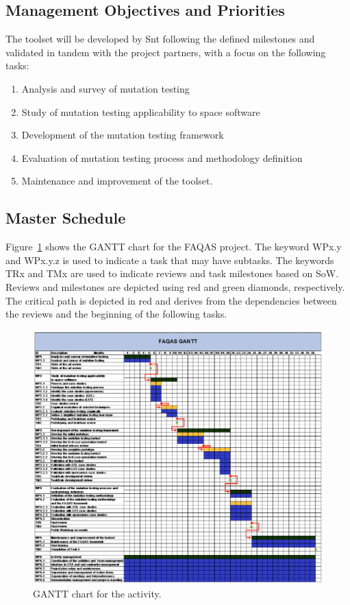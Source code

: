 \subsection{Management Objectives and Priorities}

The toolset will be developed by Snt following the defined milestones and validated in tandem with the project partners, with a focus on the following tasks:
\begin{enumerate}
  \item Analysis and survey of mutation testing
  \item Study of mutation testing applicability to space software
  \item Development of the mutation testing framework
  \item Evaluation of mutation testing process and methodology
definition
  \item Maintenance and improvement of the toolset.
\end{enumerate}

\subsection{Master Schedule}

Figure~\ref{fig:GANTT} shows the GANTT chart for the FAQAS project.
The keyword WPx.y and WPx.y.z is used to indicate a task that may have subtasks. The keywords TRx and TMx are used to indicate reviews and task milestones based on SoW. Reviews and milestones are depicted using red and green diamonds, respectively. The critical path is depicted in red and derives from the dependencies between the reviews and the beginning of the following tasks.

\begin{figure}[h]
\caption{GANTT chart for the activity.}
\label{fig:GANTT}
\centering
\includegraphics[width=\textwidth]{images/gantt}
\end{figure}

